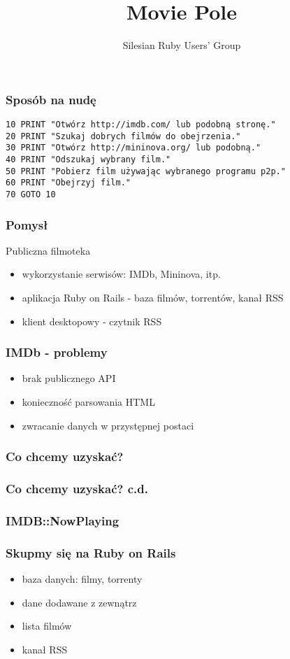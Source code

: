 \documentclass[12t]{beamer}
\author{Silesian Ruby Users' Group}
\title{Movie Pole}
\begin{document}
\frame{\titlepage}


\begin{frame}[fragile]
  \frametitle{Sposób na nudę}
\begin{verbatim}
10 PRINT "Otwórz http://imdb.com/ lub podobną stronę."
20 PRINT "Szukaj dobrych filmów do obejrzenia."
30 PRINT "Otwórz http://mininova.org/ lub podobną."
40 PRINT "Odszukaj wybrany film."
50 PRINT "Pobierz film używając wybranego programu p2p."
60 PRINT "Obejrzyj film."
70 GOTO 10
\end{verbatim}
\end{frame}

\begin{frame}
  \frametitle{Pomysł}
  Publiczna filmoteka
  \begin{itemize}
  \item wykorzystanie serwisów: IMDb, Mininova, itp.
  \item aplikacja Ruby on Rails - baza filmów, torrentów, kanał RSS
  \item klient desktopowy - czytnik RSS
  \end{itemize}
\end{frame}

\begin{frame}
  \frametitle{IMDb - problemy}
  \begin{itemize}
  \item brak publicznego API
  \item konieczność parsowania HTML
  \item zwracanie danych w przystępnej postaci
  \end{itemize}
\end{frame}

\begin{frame}[fragile]
  \frametitle{Co chcemy uzyskać?}
  
\end{frame}

\begin{frame}[fragile]
  \frametitle{Co chcemy uzyskać? c.d.}
  
\end{frame}

\begin{frame}[fragile]
  \frametitle{IMDB::NowPlaying}
  \begin{footnotesize}
    
  \end{footnotesize}
\end{frame}

\begin{frame}
  \frametitle{Skupmy się na Ruby on Rails}
  \begin{itemize}
  \item baza danych: filmy, torrenty
  \item dane dodawane z zewnątrz
  \item lista filmów
  \item kanał RSS
  \end{itemize}
\end{frame}
\end{document}
